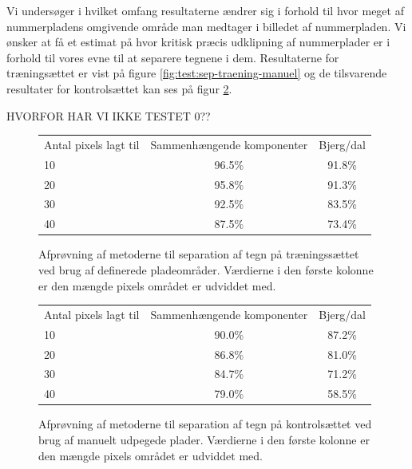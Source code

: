 Vi undersøger i hvilket omfang resultaterne ændrer sig i forhold til hvor meget af nummerpladens omgivende område man medtager i billedet af nummerpladen. Vi ønsker at få et estimat på hvor kritisk præcis udklipning af nummerplader er i forhold til vores evne til at separere tegnene i dem. Resultaterne for træningsættet er vist på figure \vref{fig:test:sep-traening-manuel} og de tilsvarende resultater for kontrolsættet kan ses på figur \ref{fig:test:sep-kontrol-manuel}.

HVORFOR HAR VI IKKE TESTET 0??


\begin{figure}[htp]
\centering
\begin{tabular}{|l|c|c|}\hline
\rowcolor[gray]{0.9} \multicolumn{3}{|>{\columncolor[gray]{0.9}}c|}{\textbf{Separation af tegn - Træningssæt}} \\ \hline
Antal pixels lagt til & Sammenhængende komponenter & Bjerg/dal \\\hline
10 & 96.5\% & 91.8\% \\\hline
20 & 95.8\% & 91.3\% \\\hline
30 & 92.5\% & 83.5\% \\\hline
40 & 87.5\% & 73.4\% \\\hline \end{tabular}
\caption{Afprøvning af metoderne til separation af tegn på træningssættet ved brug af definerede pladeområder. Værdierne i den første kolonne er den mængde pixels området er udviddet med.}
\label{fig:test:sep-traening-manuel}
\end{figure}

\begin{figure}[htp]
\centering
\begin{tabular}{|l|c|c|}\hline
\rowcolor[gray]{0.9} \multicolumn{3}{|>{\columncolor[gray]{0.9}}c|}{\textbf{Separation af tegn - Kontrolsæt}} \\ \hline
Antal pixels lagt til & Sammenhængende komponenter & Bjerg/dal \\\hline
10 & 90.0\% & 87.2\% \\\hline
20 & 86.8\% & 81.0\% \\\hline
30 & 84.7\% & 71.2\% \\\hline
40 & 79.0\% & 58.5\% \\\hline \end{tabular}
\caption{Afprøvning af metoderne til separation af tegn på kontrolsættet ved brug af manuelt udpegede plader. Værdierne i den første kolonne er den mængde pixels området er udviddet med.}
\label{fig:test:sep-kontrol-manuel}
\end{figure}

